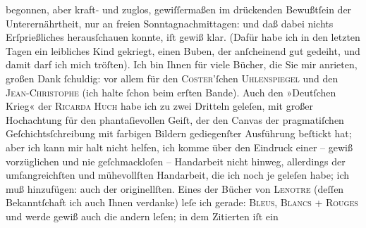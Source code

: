 \begin{ledgroupsized}[t]{13cm}
                    begonnen, aber kraft- und zuglos, gewiſſermaßen  im drückenden Bewußtſein der Unterernährtheit, nur an freien
                    Sonntagnachmittagen: und daß dabei nichts Erſprießliches herausſchauen konnte,
                    iſt gewiß klar.\pend
           \pstart
           (Dafür habe ich in den letzten Tagen ein leibliches Kind gekriegt, einen Buben, der
                    anſcheinend gut gedeiht, und damit darf ich mich tröſten).\pend
           \pstart
           Ich bin Ihnen für viele Bücher, die Sie mir anrieten, großen Dank ſchuldig: vor
                    allem für den \textsc{Coster}’ſchen \textsc{Uhlenspiegel} und den \textsc{Jean-Christophe} (ich halte ſchon beim erſten Bande). Auch den »Deutſchen Krieg« der \textsc{Ricarda Huch} habe ich zu zwei Dritteln geleſen, mit großer Hochachtung für den
                    phantaſievollen Geiſt, der den Canvas der pragmatiſchen Geſchichtsſchreibung mit
                        {\pb}farbigen Bildern gediegenſter Ausführung
                    beſtickt hat; aber ich kann mir halt nicht helfen, ich komme über den Eindruck
                    einer – gewiß vorzüglichen und nie geſchmackloſen – Handarbeit nicht  hinweg, allerdings der umfangreichſten und
                    mühevollſten Handarbeit, die ich noch je geleſen habe; ich muß hinzufügen: auch
                    der originellſten.\pend
           \pstart
           Eines der Bücher von \textsc{Lenotre} (deſſen Bekanntſchaft ich auch Ihnen verdanke) leſe ich gerade: \textsc{Bleus, Blancs + Rouges} und werde gewiß auch die andern leſen; in dem Zitierten iſt ein

\end{ledgroupsized}
